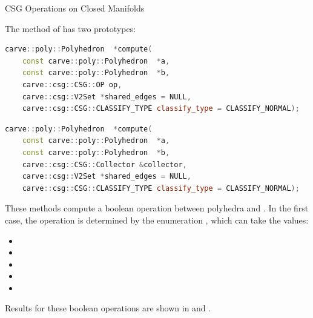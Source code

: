 \documentclass{carve}
\begin{document}
\begin{section}{CSG Operations on Closed Manifolds}

The  method of  has two prototypes:

\begin{lstlisting}[language=C++]
carve::poly::Polyhedron  *compute(
    const carve::poly::Polyhedron  *a,
    const carve::poly::Polyhedron  *b,
    carve::csg::CSG::OP op,
    carve::csg::V2Set *shared_edges = NULL,
    carve::csg::CSG::CLASSIFY_TYPE classify_type = CLASSIFY_NORMAL);
\end{lstlisting}

\begin{lstlisting}[language=C++]
carve::poly::Polyhedron  *compute(
    const carve::poly::Polyhedron  *a,
    const carve::poly::Polyhedron  *b,
    carve::csg::CSG::Collector &collector,
    carve::csg::V2Set *shared_edges = NULL,
    carve::csg::CSG::CLASSIFY_TYPE classify_type = CLASSIFY_NORMAL);
\end{lstlisting}

These methods compute a boolean operation between polyhedra 
and . In the first case, the operation is determined by the
enumeration , which can take the values:

\begin{itemize}
\item {}
\item {}
\item {}
\item {}
\item {}
\end{itemize}

\noindent Results for these boolean operations are shown in
 and .


\end{section}
\end{document}
